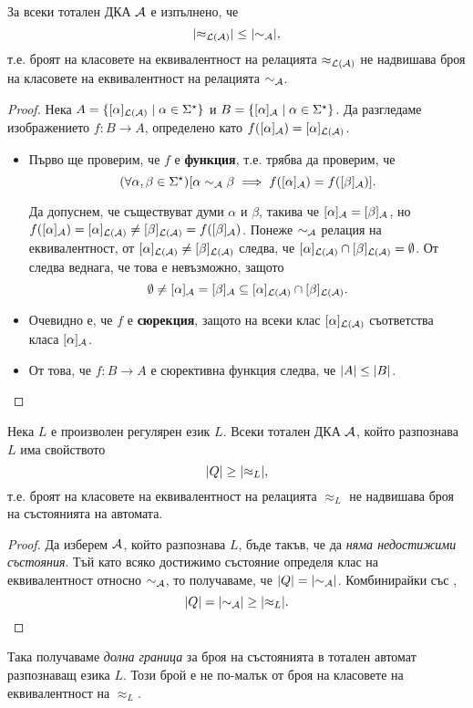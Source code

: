 \begin{cor}
  \label{cor:approx-less-sim}
  За всеки тотален ДКА $\mathcal{A}$ е изпълнено, че
  \[\lvert{\approx_{\mathcal{L}(\mathcal{A})}}\rvert \leq \lvert{\sim_{\mathcal{A}}}\rvert,\]
  т.е. броят на класовете на еквивалентност на релацията $\approx_{\mathcal{L}(\mathcal{A})}$
  не надвишава броя на класовете на еквивалентност на релацията $\sim_{\mathcal{A}}$.
\end{cor}
\begin{proof}
  Нека $A = \{[\alpha]_{\mathcal{L}(\mathcal{A})} \mid \alpha\in\Sigma^\star\}$ и $B = \{[\alpha]_{\mathcal{A}} \mid \alpha\in\Sigma^\star\}$.
  Да разгледаме изображението $f:B\to A$, определено като $f([\alpha]_{\mathcal{A}}) = [\alpha]_{\mathcal{L}(\mathcal{A})}$.
  \begin{itemize}
  \item 
    Първо ще проверим, че $f$ е {\bf функция}, т.е. трябва да проверим, че 
    \[(\forall\alpha,\beta\in\Sigma^\star)[\alpha \sim_{\mathcal{A}} \beta \implies f([\alpha]_{\mathcal{A}}) = f([\beta]_{\mathcal{A}})].\]
    
    Да допуснем, че съществуват думи $\alpha$ и $\beta$, такива че
    $[\alpha]_{\mathcal{A}} = [\beta]_{\mathcal{A}}$, но $f([\alpha]_{\mathcal{A}}) = [\alpha]_{\mathcal{L}(\mathcal{A})} \neq [\beta]_{\mathcal{L}(\mathcal{A})} = f([\beta]_{\mathcal{A}})$.
    Понеже $\sim_{\mathcal{A}}$ релация на еквивалентност, от $[\alpha]_{\mathcal{L}(\mathcal{A})} \neq [\beta]_{\mathcal{L}(\mathcal{A})}$
    следва, че $[\alpha]_{\mathcal{L}(\mathcal{A})} \cap [\beta]_{\mathcal{L}(\mathcal{A})} = \emptyset$.
    От  следва веднага, че това е невъзможно, защото
    \[\emptyset \neq [\alpha]_{\mathcal{A}} = [\beta]_{\mathcal{A}} \subseteq [\alpha]_{\mathcal{L}(\mathcal{A})} \cap [\beta]_{\mathcal{L}(\mathcal{A})}.\]
  \item
    Очевидно е, че $f$ е {\bf сюрекция}, защото на всеки клас $[\alpha]_{\mathcal{L}(\mathcal{A})}$ съответства класа $[\alpha]_{\mathcal{A}}$.
  \item
    От това, че $f:B\to A$ е сюрективна функция следва, че $\lvert{A}\rvert \leq \lvert{B}\rvert$.
  \end{itemize}
\end{proof}

\begin{cor}
  \label{cor:upper-bound}
  Нека $L$ е произволен регулярен език $L$.  
  Всеки тотален ДКА $\mathcal{A}$, който разпознава $L$ има свойството
  \[\lvert{Q}\rvert \geq \lvert{\approx_L}\rvert,\]
  т.е. броят на класовете на еквивалентност на релацията $\approx_L$
  не надвишава броя на състоянията на автомата.
\end{cor}
\begin{proof}
  Да изберем $\mathcal{A}$, който разпознава $L$, бъде такъв, че да {\em няма недостижими състояния}.
  Тъй като всяко достижимо състояние определя клас на еквивалентност относно $\sim_{\mathcal{A}}$,
  то получаваме, че $\lvert{Q}\rvert = \lvert{\sim_{\mathcal{A}}}\rvert$.
  Комбинирайки със ,
  \[\lvert{Q}\rvert = \lvert{\sim_{\mathcal{A}}}\rvert \geq \lvert{\approx_L}\rvert.\]
\end{proof}
Така получаваме {\em долна граница} за броя на състоянията в тотален автомат разпознаващ езика $L$.
Този брой е не по-малък от броя на класовете на еквивалентност на $\approx_L$.


